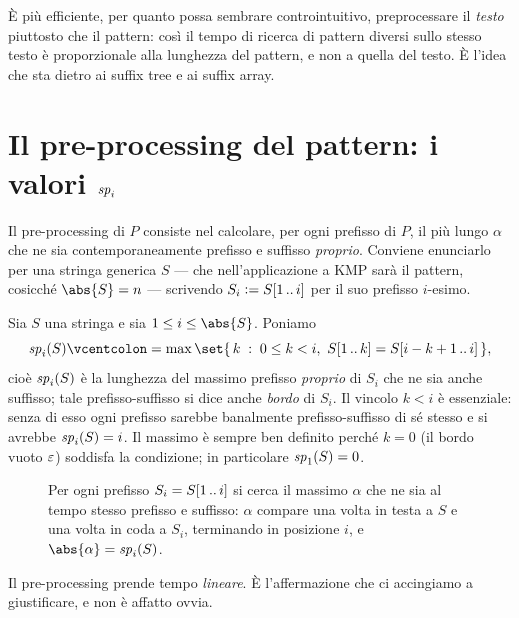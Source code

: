 \begin{osservazione}
  È più efficiente, per quanto possa sembrare contro\-intuitivo, preprocessare
  il \emph{testo} piuttosto che il pattern: così il tempo di ricerca di pattern
  diversi sullo stesso testo è proporzionale alla lunghezza del pattern, e non a
  quella del testo. È l'idea che sta dietro ai suffix tree e ai suffix array.
\end{osservazione}

\section{Il pre-processing del pattern: i valori
  \texorpdfstring{$\mathit{sp}_{i}$}{sp\_i}}
\label{sec:kmp-preprocessing}

Il pre-processing di $P$ consiste nel calcolare, per ogni prefisso di $P$, il più
lungo $\alpha$ che ne sia contemporaneamente prefisso e suffisso \emph{proprio}.
Conviene enunciarlo per una stringa generica $S$ --- che nell'applicazione a KMP
sarà il pattern, cosicché $\abs{S}=n$ --- scrivendo $S_i \vcentcolon= S[1\,..\,i]$ per
il suo prefisso $i$-esimo.

\begin{definizione}\label{def:sp-i}
  Sia $S$ una stringa e sia $1\le i\le\abs{S}$. Poniamo
  \[
    \spv{i}(S) \defeq \max\set{\,k \;:\; 0\le k<i,\ \pre{S}{k}=\sub{S}{i-k+1}{i}\,} ,
  \]
  cioè $\mathit{sp}_{i}(S)$ è la lunghezza del massimo prefisso \emph{proprio} di $S_i$
  che ne sia anche suffisso; tale prefisso-suffisso si dice anche \emph{bordo}
  di $S_i$. Il vincolo $k<i$ è essenziale: senza di esso ogni
  prefisso sarebbe banalmente prefisso-suffisso di sé stesso e si avrebbe
  $\mathit{sp}_{i}(S)=i$. Il massimo è sempre ben definito perché $k=0$ (il bordo vuoto
  $\varepsilon$) soddisfa la condizione; in particolare $\mathit{sp}_{1}(S)=0$.
\end{definizione}

\begin{figure}[H]
  \centering
  
  \caption{Per ogni prefisso $S_i=S[1\,..\,i]$ si cerca il massimo $\alpha$ che ne
  sia al tempo stesso prefisso e suffisso: $\alpha$ compare una volta in testa a
  $S$ e una volta in coda a $S_i$, terminando in posizione $i$, e
  $\abs{\alpha}=\spv{i}(S)$.}
  \label{fig:kmp-alfa-S}
\end{figure}

\begin{osservazione}
  Il pre-processing prende tempo \emph{lineare}. È l'affermazione che ci
  accingiamo a giustificare, e non è affatto ovvia.
\end{osservazione}

